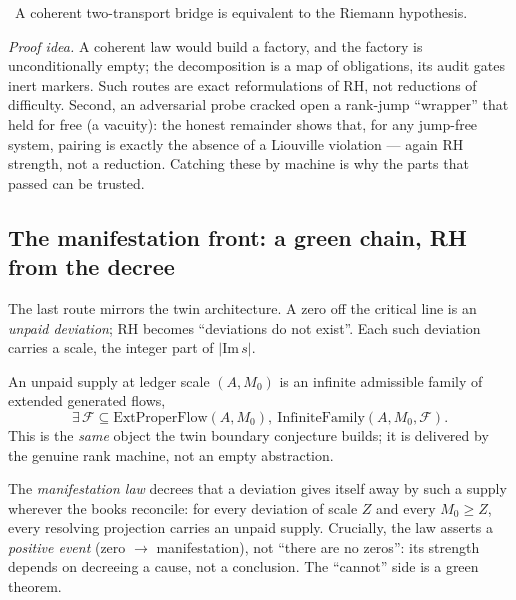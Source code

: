 \begin{theorem}\label{thm:coherentTwoTransportBridge_iff_RH}
\green{}\ A coherent two-transport bridge is equivalent to the Riemann hypothesis.
\end{theorem}

\emph{Proof idea.} A coherent law would build a factory, and the factory is unconditionally empty;
the decomposition is a map of obligations, its audit gates inert markers. Such routes are exact
reformulations of RH, not reductions of difficulty. Second, an adversarial probe cracked open a
rank-jump ``wrapper'' that held for free (a \warn{} vacuity): the honest remainder shows that, for
any jump-free system, pairing is exactly the absence of a Liouville violation --- again RH strength,
not a reduction. Catching these by machine is why the parts that passed can be trusted.

\subsection{The manifestation front: a green chain, RH from the decree}

The last route mirrors the twin architecture. A zero off the critical line is an \emph{unpaid
deviation}; RH becomes ``deviations do not exist''. Each such deviation carries a scale, the integer
part of $|\mathrm{Im}\,s|$.

\begin{definition}\label{def:DeviationFlowSupply}
An unpaid supply at ledger scale $(A,M_0)$ is an infinite admissible family of extended generated
flows,
\begin{equation}\label{eq:deviation-supply}
  \exists\,\mathcal{F}\subseteq\mathrm{ExtProperFlow}(A,M_0),\ \mathrm{InfiniteFamily}(A,M_0,\mathcal{F}) .
\end{equation}
This is the \emph{same} object the twin boundary conjecture builds; it is delivered by the genuine
rank machine, not an empty abstraction. 
\end{definition}

The \emph{manifestation law} decrees that a deviation gives itself away by such a supply wherever the
books reconcile: for every deviation of scale $Z$ and every $M_0\ge Z$, every resolving projection
carries an unpaid supply. Crucially, the law asserts a \emph{positive event} (zero $\to$
manifestation), not ``there are no zeros'': its strength depends on decreeing a cause, not a
conclusion. The ``cannot'' side is a green theorem.


